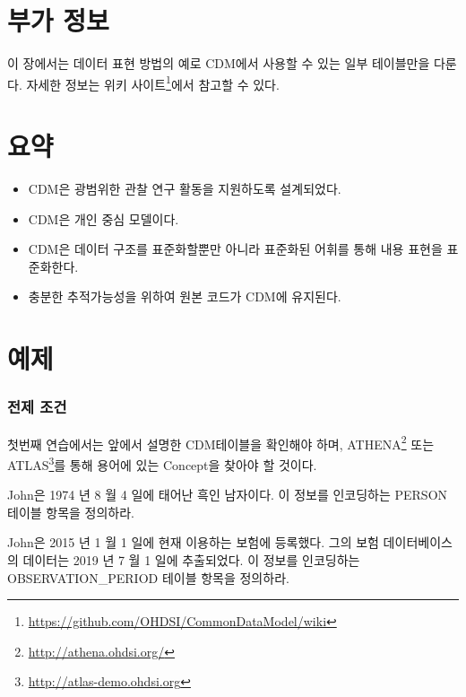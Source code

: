 \documentclass[11pt]{book}
\let\rmarkdownfootnote\footnote%
\def\footnote{\protect\rmarkdownfootnote}
\theoremstyle{definition}
\theoremstyle{definition}
\theoremstyle{definition}
\theoremstyle{remark}
\let\BeginKnitrBlock\begin \let\EndKnitrBlock\end
\begin{document}
\section{부가 정보}\label{-}

이 장에서는 데이터 표현 방법의 예로 CDM에서 사용할 수 있는 일부
테이블만을 다룬다. 자세한 정보는 위키 사이트\footnote{\url{https://github.com/OHDSI/CommonDataModel/wiki}}에서
참고할 수 있다.

\section{요약}\label{-2}

\BeginKnitrBlock{rmdsummary}
\begin{itemize}
\item
  CDM은 광범위한 관찰 연구 활동을 지원하도록 설계되었다.
\item
  CDM은 개인 중심 모델이다.
\item
  CDM은 데이터 구조를 표준화할뿐만 아니라 표준화된 어휘를 통해 내용
  표현을 표준화한다.
\item
  충분한 추적가능성을 위하여 원본 코드가 CDM에 유지된다.
\end{itemize}
\EndKnitrBlock{rmdsummary}

\section{예제}

\subsubsection*{전제 조건}\label{-}

첫번째 연습에서는 앞에서 설명한 CDM테이블을 확인해야 하며,
ATHENA\footnote{\url{http://athena.ohdsi.org/}} 또는 ATLAS\footnote{\url{http://atlas-demo.ohdsi.org}}를
통해 용어에 있는 Concept을 찾아야 할 것이다.

\BeginKnitrBlock{exercise}
\protect\hypertarget{exr:exerciseJohnPerson}{}{\label{exr:exerciseJohnPerson}
}John은 1974 년 8 월 4 일에 태어난 흑인 남자이다. 이 정보를 인코딩하는
PERSON 테이블 항목을 정의하라.
\EndKnitrBlock{exercise}

\BeginKnitrBlock{exercise}
\protect\hypertarget{exr:exerciseJohnOp}{}{\label{exr:exerciseJohnOp}
}John은 2015 년 1 월 1 일에 현재 이용하는 보험에 등록했다. 그의 보험
데이터베이스의 데이터는 2019 년 7 월 1 일에 추출되었다. 이 정보를
인코딩하는 OBSERVATION\_PERIOD 테이블 항목을 정의하라.
\EndKnitrBlock{exercise}
\end{document}

